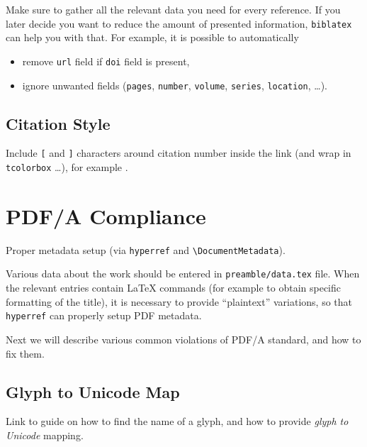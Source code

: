\begin{remark}
    Make sure to gather all the relevant data you need for every reference.
    If you later decide you want to reduce the amount of presented information, \texttt{biblatex} can help you with that.
    For example, it is possible to automatically
    \begin{itemize}
        \item remove \texttt{url} field if \texttt{doi} field is present,
        \item ignore unwanted fields (\texttt{pages}, \texttt{number}, \texttt{volume}, \texttt{series}, \texttt{location}, \ldots). \qedhere*
    \end{itemize}
\end{remark}

\subsection{Citation Style}%
\label{sub:Citation Style}

Include \texttt{[} and \texttt{]} characters around citation number inside the link (and wrap in \texttt{tcolorbox} \ldots), for example \autocite{TeXtured}.


\section{PDF/A Compliance}%
\label{sec:PDF/A Compliance}

Proper metadata setup (via \texttt{hyperref} and \verb|\DocumentMetadata|).
\begin{remark}
    Various data about the work should be entered in \texttt{preamble/data.tex} file.
    When the relevant entries contain \LaTeX{} commands (for example to obtain specific formatting of the title), it is necessary to provide \enquote{plaintext} variations, so that \texttt{hyperref} can properly setup PDF metadata.
\end{remark}

Next we will describe various common violations of PDF/A standard, and how to fix them.

\subsection{Glyph to Unicode Map}%
\label{sub:Glyph to Unicode Map}

\begin{Todo}
    Link to guide on how to find the name of a glyph, and how to provide \emph{glyph to Unicode} mapping.
\end{Todo}

